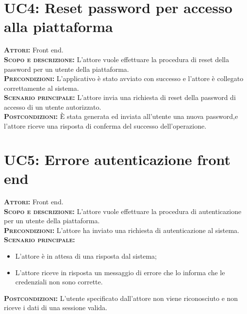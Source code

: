 \section{UC4: Reset password per accesso alla piattaforma}
\label{sec:uc4}
\textsc{\textbf{Attori:}} Front end.\\
\textsc{\textbf{Scopo e descrizione:}} L'attore vuole effettuare la procedura di reset della password per un utente della piattaforma.\\
\textsc{\textsc{\textbf{Precondizioni:}}} L'applicativo è stato avviato con successo e l'attore è collegato correttamente al sistema.\\
\textsc{\textbf{Scenario principale:}} L'attore invia una richiesta di reset della password di accesso di un utente autorizzato.\\
\textsc{\textbf{Postcondizioni:}} È stata generata ed inviata all'utente una nuova password,e l'attore riceve una risposta di conferma del successo dell'operazione.

\section{UC5: Errore autenticazione front end}
\label{sec:UC5}
\textsc{\textbf{Attori:}} Front end.\\
\textsc{\textbf{Scopo e descrizione:}} L'attore vuole effettuare la procedura di autenticazione per un utente della piattaforma.\\
\textsc{\textsc{\textbf{Precondizioni:}}} L'attore ha inviato una richiesta di autenticazione al sistema.\\
\textsc{\textbf{Scenario principale:}} 
\begin{itemize}
    \item L'attore è in attesa di una risposta dal sistema;
    \item L'attore riceve in risposta un messaggio di errore che lo informa che le credenziali non sono corrette.
\end{itemize}
\textsc{\textbf{Postcondizioni:}} L'utente specificato dall'attore non viene riconosciuto e non riceve i dati di una sessione valida.

